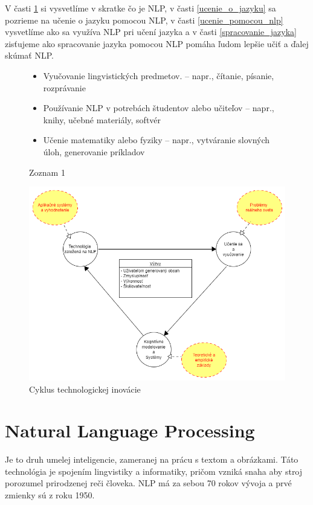 \documentclass[10pt,slovak,a4paper,twoside]{article}
\begin{document}
V časti \ref{NLP} si vysvetlíme v skratke čo je NLP, v časti \ref{ucenie_o_jazyku} sa pozrieme na učenie o jazyku pomocou NLP, 
v časti \ref{ucenie_pomocou_nlp} vysvetlíme ako sa využíva NLP pri učení jazyka a v časti \ref{spracovanie_jazyka} zisťujeme ako 
spracovanie jazyka pomocou NLP pomáha ľudom lepšie učiť a ďalej skúmať NLP.



\begin{framed}
	\centering
	\begin{figure}[H]
		\begin{itemize}\label{zoznam_1}
			\item Vyučovanie lingvistických predmetov.
			– napr., čítanie, písanie, rozprávanie
			\item Používanie NLP v potrebách študentov alebo učiteľov
			– napr., knihy, učebné materiály, softvér
			\item Učenie matematiky alebo fyziky
			– napr., vytváranie slovných úloh, generovanie príkladov
		\end{itemize}
		\centering Zoznam 1
	\end{figure}
\end{framed}
\begin{framed}
	\begin{figure}[H]\label{nlp_obrazok}
		\includegraphics{nlp}
		\centering
		\caption{Cyklus technologickej inovácie}
	\end{figure}
\end{framed}
\section{Natural Language Processing} \label{NLP}
Je to druh umelej inteligencie, zameranej na prácu s textom a obrázkami.  
Táto technológia je spojením lingvistiky a informatiky, 
pričom vzniká snaha aby stroj porozumel prirodzenej reči človeka.
NLP má za sebou 70 rokov vývoja a prvé zmienky sú z roku 1950\cite{historia}.
\end{document}
